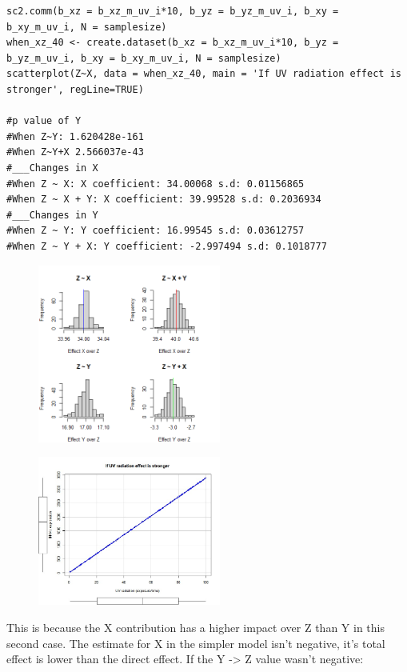\documentclass{article}
\begin{document}
\begin{lstlisting}
sc2.comm(b_xz = b_xz_m_uv_i*10, b_yz = b_yz_m_uv_i, b_xy = b_xy_m_uv_i, N = samplesize)
when_xz_40 <- create.dataset(b_xz = b_xz_m_uv_i*10, b_yz = b_yz_m_uv_i, b_xy = b_xy_m_uv_i, N = samplesize)
scatterplot(Z~X, data = when_xz_40, main = 'If UV radiation effect is stronger', regLine=TRUE)

#p value of Y
#When Z~Y: 1.620428e-161
#When Z~Y+X 2.566037e-43 
#___Changes in X
#When Z ~ X: X coefficient: 34.00068 s.d: 0.01156865
#When Z ~ X + Y: X coefficient: 39.99528 s.d: 0.2036934
#___Changes in Y
#When Z ~ Y: Y coefficient: 16.99545 s.d: 0.03612757
#When Z ~ Y + X: Y coefficient: -2.997494 s.d: 0.1018777
\end{lstlisting}

\begin{figure}[h]
\includegraphics[width=6cm]{hist40.png}
\centering
\end{figure}

\begin{figure}[h]
\includegraphics[width=6cm]{scatterplotradiationHIGH.jpeg}
\centering
\end{figure}

This is because the X contribution has a higher impact over Z than Y in this second case. The estimate for X in the simpler model isn't negative, it's total effect is lower than the direct effect. If the Y -> Z value wasn't negative:
\end{document}
